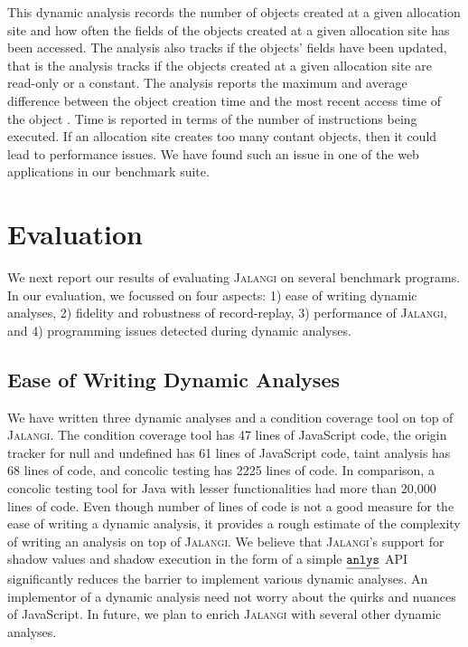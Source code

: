 \documentclass{sig-alternate}
\def\jalangi{\textsc{Jalangi}}
\newcommand \usl [1] {\mbox{\underline{\tt #1}}\xspace}
\newcommand \analysis{\usl{anlys}}
\begin{document}
This dynamic analysis records the number of objects created at a given
allocation site and how often the fields of the objects created at a
given allocation site has been accessed.  The analysis also tracks if
the objects' fields have been updated, that is the analysis tracks if
the objects created at a given allocation site are read-only or a
constant.  The analysis reports the maximum and average difference
between the object creation time and the most recent access time of
the object .  Time is reported in terms of the number of instructions
being executed.  If an allocation site creates too many contant
objects, then it could lead to performance issues.  We have found such
an issue in one of the web applications in our benchmark suite.


\section{Evaluation}
\label{sec:evaluation}

We next report our results of evaluating \jalangi{} on several
benchmark programs.  In our evaluation, we focussed on four aspects:
1) ease of writing dynamic analyses, 2) fidelity and robustness of
record-replay, 3) performance of \jalangi{}, and 4) programming issues
detected during dynamic analyses.

\subsection{Ease of Writing Dynamic Analyses}
\label{sec:ease-writing-dynamic}

We have written three dynamic analyses and a condition coverage tool
on top of \jalangi{}.  The condition coverage tool has 47 lines of
JavaScript code, the origin tracker for null and undefined has 61
lines of JavaScript code, taint analysis has 68 lines of code, and
concolic testing has 2225 lines of code.  In comparison, a concolic
testing tool for Java with lesser functionalities had more than 20,000
lines of code.  Even though number of lines of code is not a good
measure for the ease of writing a dynamic analysis, it provides a
rough estimate of the complexity of writing an analysis on top of
\jalangi{}.  We believe that \jalangi{}'s support for shadow values
and shadow execution in the form of a simple $\analysis$ API
significantly reduces the barrier to implement various dynamic
analyses.  An implementor of a dynamic analysis need not worry about
the quirks and nuances of JavaScript.  In future, we plan to enrich
\jalangi{} with several other dynamic analyses.
\end{document}

